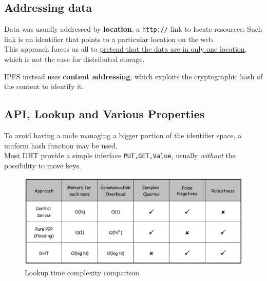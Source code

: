 \newpage
\subsection{Addressing data}
Data was usually addressed by \textbf{location}, a \texttt{http://} link to locate resources;
Such link is an identifier that points to a particular location on the web.\\
This approach forces us all to \ul{pretend that the data are in only one location}, which is not the case for distributed storage.

IPFS instead uses \textbf{content addressing}, which exploits the cryptographic hash of the content to identify it.

\subsection{API, Lookup and Various Properties}
To avoid having a node managing a bigger portion of the identifier space, a uniform hash function may be used.\\
Most DHT provide a simple inferface \texttt{PUT,GET,Value}, usually \textit{without} the possibility to move keys.

\begin{figure}[htbp]
   \centering
   \includegraphics{images/DHT_lookupcomplexity.png}
   \caption{Lookup time complexity comparison}
   \label{fig:DHT_lookupcomplexity}
\end{figure}


